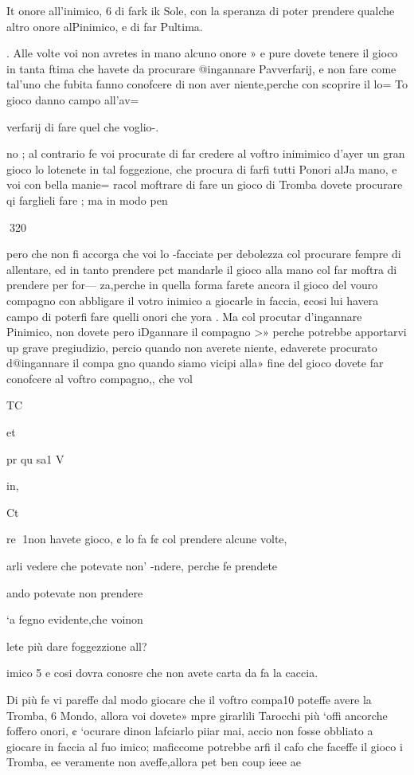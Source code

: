 \documentclass[11pt,a6paper]{article}
\begin{document}
It
onore all'inimico, 6 di fark ik
Sole, con la speranza di poter
prendere qualche altro onore
alPinimico, e di far Pultima.

. Alle volte voi non avretes
in mano alcuno onore » e pure
dovete tenere il gioco in tanta
ftima che havete da procurare
@ingannare Pavverfarij, e non
fare come tal’uno che fubita
fanno conofcere di non aver
niente,perche con scoprire il lo=
To gioco danno campo all’av=

verfarij di fare quel che voglio-.

no ; al contrario fe voi procurate di far credere al voftro inimimico d’ayer un gran gioco lo
lotenete in tal foggezione, che
procura di farfi tutti Ponori alJa mano, e voi con bella manie=
racol moftrare di fare un gioco di Tromba dovete procurare
qi farglieli fare ; ma in modo
pen

 
320

pero che non fi accorga che voi
lo -facciate per debolezza col
procurare fempre di allentare, ed in tanto prendere pct
mandarle il gioco alla mano col
far moftra di prendere per for—
za,perche in quella forma farete ancora il gioco del vouro
compagno con abbligare il votro inimico a giocarle in faccia, ¢cosi lui havera campo di
poterfi fare quelli onori che
yora .
Ma col procutar d’ingannare
Pinimico, non dovete pero iDgannare il compagno >» perche
potrebbe apportarvi up grave
pregiudizio, percio quando non
averete niente, edaverete procurato d@ingannare il compa
gno quando siamo vicipi alla»
fine del gioco dovete far conofcere al voftro compagno,, che
vol

 

TC

et

pr
qu
sa1
V

in,

Ct

re
1non havete gioco, ¢ lo fa
f¢ col prendere alcune volte,

arli vedere che potevate non’
-ndere, perche fe prendete

ando potevate non prendere

‘a fegno evidente,che voinon

lete più dare foggezzione all?

imico 5 e cosi dovra conosre che non avete carta da fa
la caccia.

Di più fe vi pareffe dal modo
giocare che il voftro compa10 poteffe avere la Tromba, 6
Mondo, allora voi dovete»
mpre girarlili Tarocchi più
‘offi ancorche foffero onori, ¢
‘ocurare dinon lafciarlo piiar mai, accio non fosse obbliato a giocare in faccia al fuo
imico; maficcome potrebbe
arfi il cafo che faceffe il gioco
i Tromba, ee veramente non
aveffe,allora pet ben coup ieee
ae
\end{document}
